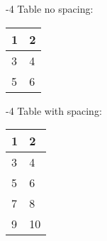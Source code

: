 			\bigbreak {}-4 Table no spacing: \bigbreak \noindent
			\begin{tabular}{|p{4cm}|p{4cm}|}
				\hline
				1 & 2 \\
				\hline
				3 & 4 \\
				\hline
				5 & 6 \\
				\hline
			\end{tabular}
			
			\bigbreak {}-4 Table with spacing: \bigbreak \noindent
			\begin{tabular}{|p{4cm}|p{4cm}|}
				\hline
				\rule{0pt}{0ex}
				1 & 2  \\[0ex]
				\hline
				\rule{0pt}{2.2ex}
				3 & 4 \\[1ex]
				\hline
				\rule{0pt}{4.2ex}
				5 & 6 \\[2ex]
				\hline
				\rule{0pt}{5.2ex}
				7 & 8 \\[3ex]
				\hline
				\rule{0pt}{6.2ex}
				9 & 10 \\[4ex]
				\hline
			\end{tabular}
			
